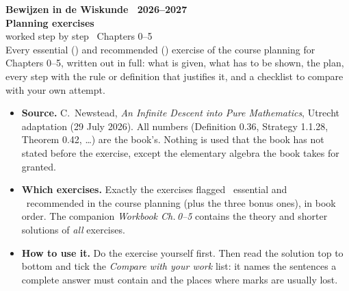 \thispagestyle{empty}
\begin{tcolorbox}[enhanced, colback=hblue, colframe=hblue, boxrule=0pt, arc=4pt, left=16pt, right=16pt, top=22pt, bottom=22pt]
  \color{white}\sffamily
  {\large\bfseries Bewijzen in de Wiskunde \textperiodcentered\ 2026--2027}\\[10pt]
  {\fontsize{30}{34}\selectfont\bfseries Planning exercises}\\[4pt]
  {\fontsize{20}{24}\selectfont worked step by step \textperiodcentered\ Chapters 0--5}\\[14pt]
  {\normalsize Every essential (\fE) and recommended (\fR) exercise of the course planning for Chapters 0--5, written out in full: what is given, what has to be shown, the plan, every step with the rule or definition that justifies it, and a checklist to compare with your own attempt.}
\end{tcolorbox}

\vspace{10pt}
\begin{tcolorbox}[enhanced, colback=white, colframe=hblue2, boxrule=0.8pt, arc=2pt, left=10pt, right=10pt, top=8pt, bottom=8pt]
\sffamily\small\sloppy
\begin{itemize}[leftmargin=1.2em]
\item \textbf{\textcolor{hblue}{Source.}} C.~Newstead, \emph{An Infinite Descent into Pure Mathematics}, Utrecht adaptation (29 July 2026). All numbers (Definition 0.36, Strategy 1.1.28, Theorem 0.42, \dots) are the book's. Nothing is used that the book has not stated before the exercise, except the elementary algebra the book takes for granted.
\item \textbf{\textcolor{hblue}{Which exercises.}} Exactly the exercises flagged \fE\ essential and \fR\ recommended in the course planning (plus the three bonus ones), in book order. The companion \emph{Workbook Ch.\,0--5} contains the theory and shorter solutions of \emph{all} exercises.
\item \textbf{\textcolor{hblue}{How to use it.}} Do the exercise yourself first. Then read the solution top to bottom and tick the \emph{Compare with your work} list: it names the sentences a complete answer must contain and the places where marks are usually lost.
\end{itemize}
\end{tcolorbox}

\vspace{8pt}

